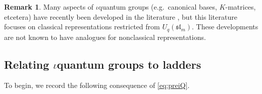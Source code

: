 \documentclass[10pt]{amsart}
\numberwithin{equation}{section}
\theoremstyle{definition}
\newtheorem{rem}[thm]{Remark}
\newcommand{\slm}{\mathfrak{sl}_{m}}
\begin{document}
\begin{rem} 
Many aspects of $\iota$quantum groups 
(e.g.~canonical bases, $K$-matrices, etcetera) 
have recently been developed in the literature \cite{WangICM}, 
but this literature focuses on classical representations restricted from $U_q(\slm)$. 
These developments are not known to have analogues for nonclassical representations. 
\end{rem}

\subsection{Relating $\iota$quantum groups to ladders}

To begin, we record the following consequence of \eqref{eq:preiQ}.
\end{document}
